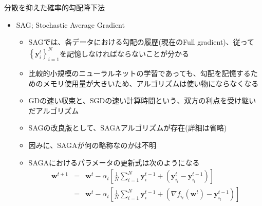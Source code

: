 \documentclass[dvipdfmx,notheorems,t]{beamer}
\begin{document}
\begin{frame}{分散を抑えた確率的勾配降下法}

\begin{itemize}
	\item SAG; Stochastic Average Gradient
	\begin{itemize}		
		\item SAGでは、各データにおける勾配の履歴(現在のFull gradient)、従って$\left\{ \bm{y}_i^t \right\}_{i = 1}^N$を記憶しなければならないことが分かる
		\newline
		
		\item 比較的小規模のニューラルネットの学習であっても、勾配を記憶するためのメモリ使用量が大きいため、アルゴリズムは使い物にならなくなる
		\newline
		
		\item GDの速い収束と、SGDの速い計算時間という、双方の利点を受け継いだアルゴリズム
		\newline
		
		\item SAGの改良版として、SAGAアルゴリズムが存在(詳細は省略)
		\item 因みに、SAGAが何の略称なのかは不明
		\newline
		
		\item SAGAにおけるパラメータの更新式は次のようになる~\cite{stochastic_2017}
		\begin{eqnarray}
			\bm{w}^{t + 1} &=& \bm{w}^t - \alpha_t \left[ \frac{1}{N} \sum_{i = 1}^N \bm{y}_i^{t - 1} + \left( \bm{y}_{i_t}^t - \bm{y}_{i_t}^{t - 1} \right) \right] \\
			&=& \bm{w}^t - \alpha_t \left[ \frac{1}{N} \sum_{i = 1}^N \bm{y}_i^{t - 1} + \left( \nabla f_{i_t}(\bm{w}^t) - \bm{y}_{i_t}^{t - 1} \right) \right]
		\end{eqnarray}
	\end{itemize}
\end{itemize}

\end{frame}
\end{document}

